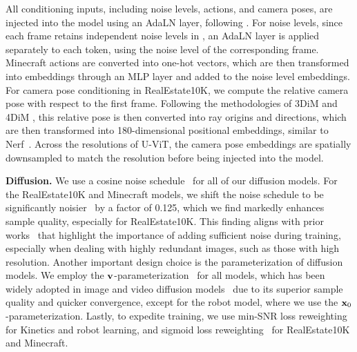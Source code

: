 All conditioning inputs, including noise levels, actions, and camera poses, are injected into the model using an AdaLN layer, following \cite{peebles2023scalable}. For noise levels, since each frame retains independent noise levels in \mtd, an AdaLN layer is applied separately to each token, using the noise level of the corresponding frame. Minecraft actions are converted into one-hot vectors, which are then transformed into embeddings through an MLP layer and added to the noise level embeddings. For camera pose conditioning in RealEstate10K, we compute the relative camera pose with respect to the first frame. Following the methodologies of 3DiM \cite{watson2022novel} and 4DiM \cite{watson2024controlling}, this relative pose is then converted into ray origins and directions, which are then transformed into 180-dimensional positional embeddings, similar to Nerf~\cite{mildenhall2021nerf}. Across the resolutions of U-ViT, the camera pose embeddings are spatially downsampled to match the resolution before being injected into the model.

\textbf{Diffusion.} We use a cosine noise schedule~\cite{nichol2021improved} for all of our diffusion models. For the RealEstate10K and Minecraft models, we shift the noise schedule to be significantly noisier~\cite{hoogeboom2023simple} by a factor of 0.125, which we find markedly enhances sample quality, especially for RealEstate10K. This finding aligns with prior works~\cite{chen2023importance, hoogeboom2023simple} that highlight the importance of adding sufficient noise during training, especially when dealing with highly redundant images, such as those with high resolution. Another important design choice is the parameterization of diffusion models. We employ the ${\mathbf{v}}$-parameterization~\cite{vparameterization} for all models, which has been widely adopted in image and video diffusion models~\cite{ho2022imagen,lin2024common} due to its superior sample quality and quicker convergence, except for the robot model, where we use the ${\mathbf{x}}_0$-parameterization. Lastly, to expedite training, we use min-SNR loss reweighting~\cite{min_snr} for Kinetics and robot learning, and sigmoid loss reweighting~\cite{kingma2023understanding,hoogeboom2024simpler} for RealEstate10K and Minecraft.

